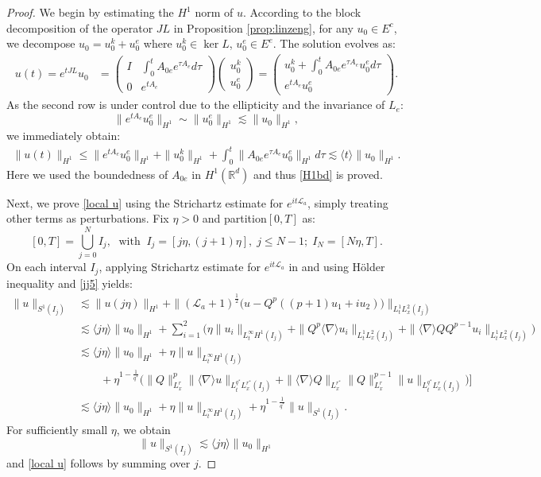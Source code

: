\documentclass[12pt]{amsart}
\newcommand{\R}{\mathbb R}
\newcommand{\la}{\mathcal L_a}
\newcommand{\lsm}{\lesssim}
\begin{document}
\begin{proof}  We begin by estimating the $H^1$ norm of $u$. According to the block decomposition of the operator $JL$ in Proposition \ref{prop:linzeng}, for any $u_0\in E^c$, we decompose $u_0=u_0^k+u_0^e$ where $u_0^k\in \ker L$, $u_0^e\in E^e$. The solution evolves as:
	\begin{align*}
		u(t)=e^{tJL}u_0 &= 
		\begin{pmatrix}
			I &  \int_0^t A_{0e}e^{\tau A_e}d\tau \\
			0 & e^{tA_e}
		\end{pmatrix}
		\begin{pmatrix}
			u_0^k \\
			u_0^e
		\end{pmatrix}
		=
		\begin{pmatrix}
			u_0^k +\int_0^t A_{0e} e^{\tau A_e}u_0^e d\tau \\
			e^{tA_e}u_0^e
		\end{pmatrix}.
	\end{align*}
As the second row is under control due to the ellipticity and the invariance of $L_e$: 
		$$
	\|e^{tA_e}u_0^e\|_{ H^1} \sim \|u_0^e\|_{H^1} \lesssim \|u_0\|_{ H^1},
	$$
we immediately obtain:
	\begin{align*}
		\|u(t)\|_{ H^1} \le \|e^{tA_e}u_0^e\|_{H^1} + \|u_0^k\|_{ H^1} 
                  +\int_0^t\|A_{0e} e^{\tau A_e}u_0^e\|_{ H^1} d\tau 
		 \lesssim \langle t \rangle \|u_0\|_{ H^1}.
	\end{align*}
Here we used the boundedness of $A_{0e}$ in $H^1(\R^d)$ and thus \eqref{H1bd} is proved. 
	
	Next, we prove \eqref{local u} using the Strichartz estimate for $e^{it\la}$, simply treating other terms as perturbations. Fix $\eta>0$ and partition$[0,T]$ as:
	$$
	[0, T] = \bigcup_{j=0}^{N} I_j, \; \mbox{ with } \ I_j=[j\eta, (j+1)\eta], \; j\le N-1; \; I_{N}=[N\eta,T].
	$$
	On each interval $I_j$, applying Strichartz estimate for $e^{it\la}$ in \cite{BPSTZ03, KT98, ZZ20} and using H\"older inequality and \eqref{jj5} yields: 
	\begin{align*}
		\|u\|_{ S^1(I_j)} &\lesssim \|u (j\eta)\|_{H^1} +
		    \|(\la+1)^{\frac 12} \bigl(u-Q^p((p+1)u_1+iu_2)\bigr)\|_{L^1_tL_x^2(I_j)} \\
		 &\lesssim \langle j\eta \rangle \|u_0\|_{H^1} +
		   \sum_{i=1}^2 \bigl(\eta \|u_i\|_{L_t^\infty H^1(I_j)}+\|Q^p\langle \nabla \rangle u_i\|_{L_t^1L_x^2(I_j)} +\|\langle  \nabla \rangle QQ^{p-1} u_i\|_{L_t^1L_x^2(I_j)} \bigr)\\
		   &\lsm \langle j\eta \rangle \|u_0\|_{H^1} +
		   \eta \|u\|_{L_t^\infty H^1(I_j)}\\
		   &\qquad+\eta^{1-\frac 1{q^*}}\bigl(\|Q\|_{L_x^r}^p \|\langle \nabla \rangle u\|_{L_t^{q^*}L_x^{r^*}(I_j)}+\|\langle \nabla \rangle Q\|_{L_x^{r^*}}\|Q\|_{L_x^r}^{p-1}\|u\|_{L_t^{q^*}L_x^r(I_j)}\bigr)\bigr]\\
		   &\lsm \langle j\eta\rangle \|u_0\|_{ H^1}+\eta \|u\|_{L_t^\infty H^1(I_j)}+\eta^{1-\frac 1{q^*}}\|u\|_{S^1(I_j)}. 	   \end{align*}	      
	For sufficiently small $\eta$, we obtain
	$$
	\|u\|_{ S^1(I_j)} \lsm\langle j\eta \rangle \|u_0\|_{H^1} 
	$$
	and \eqref{local u} follows by summing over $j$. 	
				

\end{proof}
\end{document}
